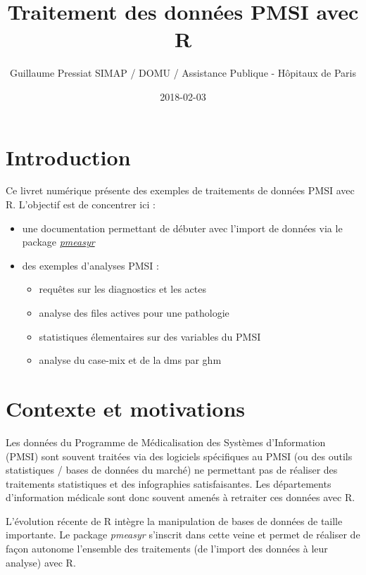 \documentclass[]{book}
\title{Traitement des données PMSI avec R}
\author{Guillaume Pressiat \textbar{}\textbar{} SIMAP / DOMU / Assistance
Publique - Hôpitaux de Paris}
\date{2018-02-03}
\providecommand{\tightlist}{%
  \setlength{\itemsep}{0pt}\setlength{\parskip}{0pt}}
\theoremstyle{definition}
\theoremstyle{definition}
\theoremstyle{definition}
\theoremstyle{remark}
\begin{document}
\maketitle

{
\setcounter{tocdepth}{1}
\tableofcontents
}
\chapter{Introduction}\label{introduction}

Ce livret numérique présente des exemples de traitements de données PMSI
avec R. L'objectif est de concentrer ici :

\begin{itemize}
\item
  une documentation permettant de débuter avec l'import de données via
  le package \href{https://github.com/IM-APHP/pmeasyr}{\emph{pmeasyr}}
\item
  des exemples d'analyses PMSI :

  \begin{itemize}
  \tightlist
  \item
    requêtes sur les diagnostics et les actes
  \item
    analyse des files actives pour une pathologie
  \item
    statistiques élementaires sur des variables du PMSI
  \item
    analyse du case-mix et de la dms par ghm
  \end{itemize}
\end{itemize}

\chapter{Contexte et motivations}\label{contexte}

Les données du Programme de Médicalisation des Systèmes d'Information
(PMSI) sont souvent traitées via des logiciels spécifiques au PMSI (ou
des outils statistiques / bases de données du marché) ne permettant pas
de réaliser des traitements statistiques et des infographies
satisfaisantes. Les départements d'information médicale sont donc
souvent amenés à retraiter ces données avec R.

L'évolution récente de R intègre la manipulation de bases de données de
taille importante. Le package \emph{pmeasyr} s'inscrit dans cette veine
et permet de réaliser de façon autonome l'ensemble des traitements (de
l'import des données à leur analyse) avec R.
\end{document}
